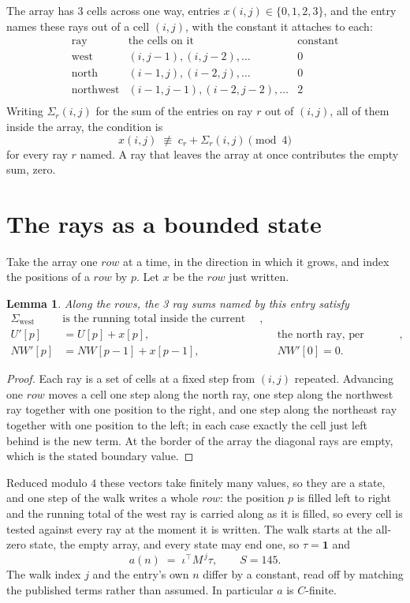 \documentclass[11pt,a4paper]{article}
\theoremstyle{plain}
\newtheorem{lemma}[theorem]{Lemma}
\theoremstyle{definition}
\begin{document}
The array has $3$ cells across one way, entries $x(i,j)\in\{0,1,2,3\}$, and the entry names these
rays out of a cell $(i,j)$, with the constant it attaches to each:
\[
\begin{array}{lll}
\text{ray} & \text{the cells on it} & \text{constant} \\[2pt]
\text{west} & (i,j-1),(i,j-2),\dots & 0 \\
\text{north} & (i-1,j),(i-2,j),\dots & 0 \\
\text{northwest} & (i-1,j-1),(i-2,j-2),\dots & 2 \\
\end{array}
\]
Writing $\Sigma_r(i,j)$ for the sum of the entries on ray $r$ out of $(i,j)$, all of them
inside the array, the condition is
\[
x(i,j)\;\not\equiv\;c_r+\Sigma_r(i,j) \pmod{4}
\]
for every ray $r$ named. A ray that leaves the array at once contributes the empty sum,
zero.

\section{The rays as a bounded state}

Take the array one $row$ at a time, in the direction in which it grows, and index the
positions of a $row $ by $p$. Let $x$ be the $row$ just written.

\begin{lemma}\label{lem:rays}
Along the $row$s, the 3 ray sums named by this entry satisfy
\[
\begin{aligned}
\Sigma_{\mathrm{west}}\ &\text{is the running total inside the current row},\\
U'[p]&=U[p]+x[p], &&\text{the north ray, per position},\\
NW'[p]&=NW[p-1]+x[p-1], && NW'[0]=0 .
\end{aligned}
\]
\end{lemma}

\begin{proof}
Each ray is a set of cells at a fixed step from $(i,j)$ repeated. Advancing one $row$
moves a cell one step along the north ray, one step along the northwest ray together with one
position to the right, and one step along the northeast ray together with one position to the
left; in each case exactly the cell just left behind is the new term. At the border of the
array the diagonal rays are empty, which is the stated boundary value.
\end{proof}

Reduced modulo $4$ these vectors take finitely many values, so they are a state, and one step
of the walk writes a whole $row$: the position $p$ is filled left to right and the
running total of the west ray is carried along as it is filled, so every cell is tested
against every ray at the moment it is written. The walk starts at the all-zero state, the empty
array, and every state may end one, so $\tau=\mathbf{1}$ and
\[
a(n)\;=\;\iota^{\!\top}M^{\,j}\tau ,\qquad S=145.
\]
The walk index $j$ and the entry's own $n$ differ by a constant, read off by matching the
published terms rather than assumed. In particular $a$ is $C$-finite.
\end{document}
